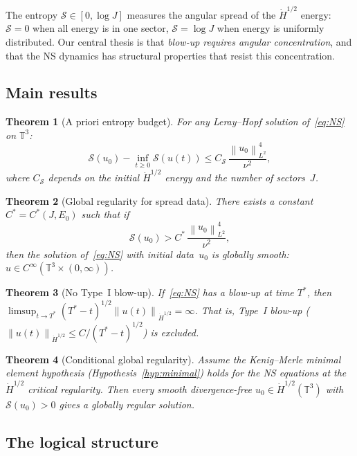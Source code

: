 \documentclass[11pt]{article}
\newtheorem{theorem}{Theorem}[section]
\theoremstyle{definition}
\newcommand{\T}{\mathbb{T}}
\newcommand{\norm}[1]{\left\| #1 \right\|}
\newcommand{\Hdot}[1]{\dot{H}^{#1}}
\newcommand{\cS}{\mathcal{S}}
\begin{document}
The entropy $\cS \in [0, \log J]$ measures the angular
spread of the $\Hdot{1/2}$ energy: $\cS = 0$ when all
energy is in one sector, $\cS = \log J$ when energy is
uniformly distributed.  Our central thesis is that
\emph{blow-up requires angular concentration}, and that
the NS dynamics has structural properties that resist
this concentration.


\subsection{Main results}

\begin{theorem}[A priori entropy budget]
\label{thm:budget-intro}
For any Leray--Hopf solution of~\eqref{eq:NS} on $\T^3$:
\begin{equation}
\cS(u_0) - \inf_{t \geq 0} \cS(u(t))
\leq C_\cS\,\frac{\norm{u_0}_{L^2}^4}{\nu^2},
\end{equation}
where $C_\cS$ depends on the initial $\Hdot{1/2}$ energy
and the number of sectors~$J$.
\end{theorem}

\begin{theorem}[Global regularity for spread data]
\label{thm:spread-intro}
There exists a constant $C^* = C^*(J, E_0)$ such that if
\begin{equation}
\cS(u_0) > C^*\,\frac{\norm{u_0}_{L^2}^4}{\nu^2},
\end{equation}
then the solution of~\eqref{eq:NS} with initial data~$u_0$
is globally smooth: $u \in C^\infty(\T^3\times(0,\infty))$.
\end{theorem}

\begin{theorem}[No Type~I blow-up]
\label{thm:typeI-intro}
If~\eqref{eq:NS} has a blow-up at time $T^*$, then
$\limsup_{t\to T^*}(T^*-t)^{1/2}\norm{u(t)}_{\Hdot{1/2}}
= \infty$.
That is, Type~I blow-up
($\norm{u(t)}_{\Hdot{1/2}} \leq C/(T^*-t)^{1/2}$) is
excluded.
\end{theorem}

\begin{theorem}[Conditional global regularity]
\label{thm:conditional-intro}
Assume the Kenig--Merle minimal element hypothesis
(Hypothesis~\ref{hyp:minimal}) holds for the NS equations
at the $\Hdot{1/2}$ critical regularity.  Then every smooth
divergence-free $u_0 \in \Hdot{1/2}(\T^3)$ with
$\cS(u_0) > 0$ gives a globally regular solution.
\end{theorem}


\subsection{The logical structure}
\end{document}
